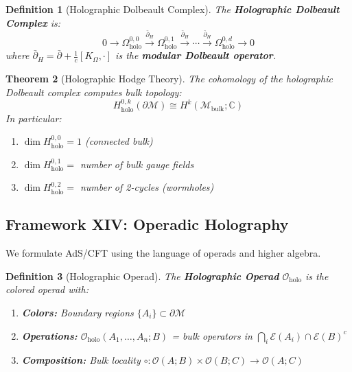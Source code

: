 \documentclass[12pt,a4paper]{article}
\newtheorem{theorem}{Theorem}[section]
\newtheorem{definition}[theorem]{Definition}
\begin{document}
\begin{definition}[Holographic Dolbeault Complex]\label{def:holo-dolbeault}
The \textbf{Holographic Dolbeault Complex} is:
\begin{equation}
0 \to \Omega^{0,0}_{\text{holo}} \xrightarrow{\bar{\partial}_H} \Omega^{0,1}_{\text{holo}} \xrightarrow{\bar{\partial}_H} \cdots \xrightarrow{\bar{\partial}_H} \Omega^{0,d}_{\text{holo}} \to 0
\end{equation}
where $\bar{\partial}_H = \bar{\partial} + \frac{1}{c}[K_\Omega, \cdot]$ is the \textbf{modular Dolbeault operator}.
\end{definition}

\begin{theorem}[Holographic Hodge Theory]\label{thm:holo-hodge}
The cohomology of the holographic Dolbeault complex computes bulk topology:
\begin{equation}
H^{0,k}_{\text{holo}}(\partial\mathcal{M}) \cong H^k(\mathcal{M}_{\text{bulk}}; \mathbb{C})
\end{equation}
In particular:
\begin{enumerate}
    \item $\dim H^{0,0}_{\text{holo}} = 1$ (connected bulk)
    \item $\dim H^{0,1}_{\text{holo}} = $ number of bulk gauge fields
    \item $\dim H^{0,2}_{\text{holo}} = $ number of 2-cycles (wormholes)
\end{enumerate}
\end{theorem}

\subsection{Framework XIV: Operadic Holography}

We formulate AdS/CFT using the language of operads and higher algebra.

\begin{definition}[Holographic Operad]\label{def:holo-operad}
The \textbf{Holographic Operad} $\mathcal{O}_{\text{holo}}$ is the colored operad with:
\begin{enumerate}
    \item \textbf{Colors:} Boundary regions $\{A_i\} \subset \partial\mathcal{M}$
    \item \textbf{Operations:} $\mathcal{O}_{\text{holo}}(A_1, \ldots, A_n; B)$ = bulk operators in $\bigcap_i \mathcal{E}(A_i) \cap \mathcal{E}(B)^c$
    \item \textbf{Composition:} Bulk locality $\circ: \mathcal{O}(A; B) \times \mathcal{O}(B; C) \to \mathcal{O}(A; C)$
\end{enumerate}
\end{definition}
\end{document}
